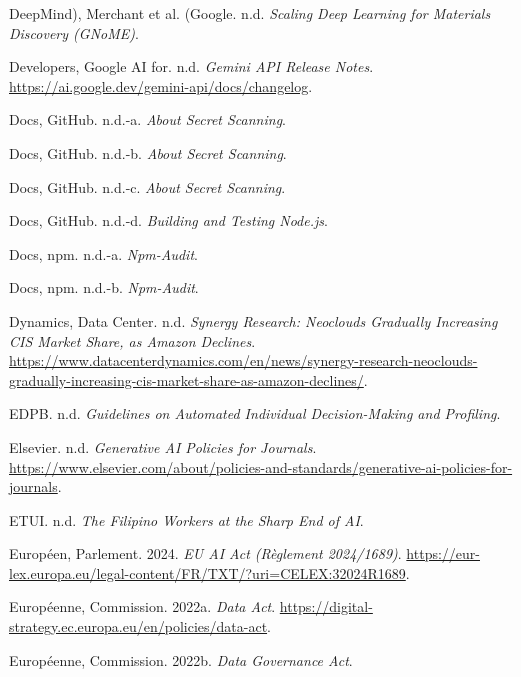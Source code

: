 \documentclass[
  10pt,
  a4paper,
  DIV=11,
  numbers=noendperiod,
  oneside]{scrreprt}
\newlength{\cslhangindent}
\newenvironment{CSLReferences}[2] %
 {\begin{list}{}{%
  \setlength{\itemindent}{0pt}
  \setlength{\leftmargin}{0pt}
  \setlength{\parsep}{0pt}
  \ifodd #1
   \setlength{\leftmargin}{\cslhangindent}
   \setlength{\itemindent}{-1\cslhangindent}
  \fi
  \setlength{\itemsep}{#2\baselineskip}}}
 {\end{list}}
\let\oldemph\emph
\renewcommand{\emph}[1]{\oldemph{\textcolor{cmmgray}{#1}}}
\begin{document}
\begin{CSLReferences}{1}{1}
DeepMind), Merchant et al. (Google. n.d. \emph{Scaling Deep Learning for
Materials Discovery (GNoME)}.

Developers, Google AI for. n.d. \emph{Gemini API Release Notes}.
\url{https://ai.google.dev/gemini-api/docs/changelog}.

Docs, GitHub. n.d.-a. \emph{About Secret Scanning}.

Docs, GitHub. n.d.-b. \emph{About Secret Scanning}.

Docs, GitHub. n.d.-c. \emph{About Secret Scanning}.

Docs, GitHub. n.d.-d. \emph{Building and Testing Node.js}.

Docs, npm. n.d.-a. \emph{Npm-Audit}.

Docs, npm. n.d.-b. \emph{Npm-Audit}.

Dynamics, Data Center. n.d. \emph{Synergy Research: Neoclouds Gradually
Increasing CIS Market Share, as Amazon Declines}.
\url{https://www.datacenterdynamics.com/en/news/synergy-research-neoclouds-gradually-increasing-cis-market-share-as-amazon-declines/}.

EDPB. n.d. \emph{Guidelines on Automated Individual Decision-Making and
Profiling}.

Elsevier. n.d. \emph{Generative AI Policies for Journals}.
\url{https://www.elsevier.com/about/policies-and-standards/generative-ai-policies-for-journals}.

ETUI. n.d. \emph{The Filipino Workers at the Sharp End of AI}.

Européen, Parlement. 2024. \emph{EU AI Act (Règlement 2024/1689)}.
\url{https://eur-lex.europa.eu/legal-content/FR/TXT/?uri=CELEX:32024R1689}.

Européenne, Commission. 2022a. \emph{Data Act}.
\url{https://digital-strategy.ec.europa.eu/en/policies/data-act}.

Européenne, Commission. 2022b. \emph{Data Governance Act}.


\end{CSLReferences}
\end{document}
